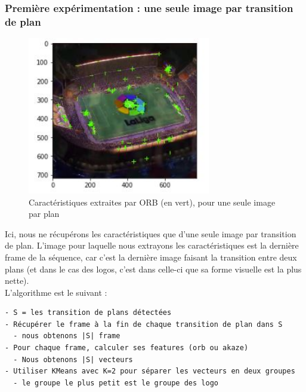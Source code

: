 \documentclass[11pt]{article}
\begin{document}
\subsubsection{Première expérimentation : une seule image par transition de plan}
\label{sec:org952f440}
\begin{figure}[htbp]
\centering
\includegraphics[width=8cm]{orb_simple_res.JPG}
\caption{Caractéristiques extraites par ORB (en vert), pour une seule image par plan}
\end{figure}
Ici, nous ne récupérons les caractéristiques que d'une seule image par transition de plan. L'image pour laquelle nous extrayons les caractéristiques est la dernière frame de la séquence, car c'est la dernière image faisant la transition entre deux plans (et dans le cas des logos, c'est dans celle-ci que sa forme visuelle est la plus nette).\\

L'algorithme est le suivant :\\
\begin{verbatim}
- S = les transition de plans détectées
- Récupérer le frame à la fin de chaque transition de plan dans S
  - nous obtenons |S| frame
- Pour chaque frame, calculer ses features (orb ou akaze)
  - Nous obtenons |S| vecteurs
- Utiliser KMeans avec K=2 pour séparer les vecteurs en deux groupes
  - le groupe le plus petit est le groupe des logo
\end{verbatim}
\end{document}
